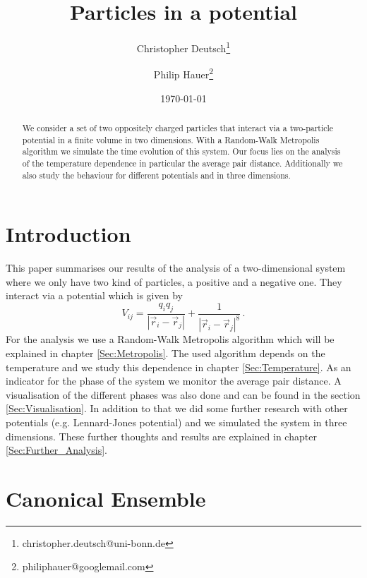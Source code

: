 \documentclass[11pt, a4paper]{article}
\title{Particles in a potential}
\author{Christopher Deutsch\footnote{christopher.deutsch@uni-bonn.de} \and Philip Hauer\footnote{philiphauer@googlemail.com}}
\date{\today}
\numberwithin{equation}{section}
\begin{document}
\begin{titlepage}

\maketitle

\begin{abstract}
\noindent 
We consider a set of two oppositely charged particles that interact via a two-particle potential in a finite volume in two dimensions. With a Random-Walk Metropolis algorithm we simulate the time evolution of this system. Our focus lies on the analysis of the temperature dependence in particular the average pair distance. Additionally we also study the behaviour for different potentials and in three dimensions.
\end{abstract}

\end{titlepage}

\tableofcontents
\newpage


\section{Introduction}
This paper summarises our results of the analysis of a two-dimensional system where we only have two kind of particles, a positive and a negative one. They interact via a potential which is given by
\begin{equation}
V_{ij} = \frac{q_i q_j}{\left| \vec{r}_i - \vec{r}_j \right|} + \frac{1}{\left| \vec{r}_i - \vec{r}_j \right|^8} \, .
\end{equation}
For the analysis we use a Random-Walk Metropolis algorithm which will be explained in chapter \ref{Sec:Metropolis}. The used algorithm depends on the temperature and we study this dependence in chapter \ref{Sec:Temperature}. As an indicator for the phase of the system we monitor the average pair distance. A visualisation of the different phases was also done and can be found in the section \ref{Sec:Visualisation}. In addition to that we did some further research with other potentials (e.g. Lennard-Jones potential) and we simulated the system in three dimensions. These further thoughts and results are explained in chapter \ref{Sec:Further_Analysis}.

\section{Canonical Ensemble} \label{Sec:Canonical_Ensemble}
\end{document}
